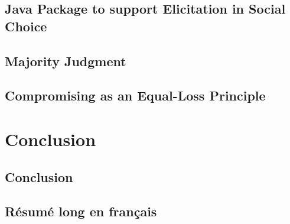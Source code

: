 \documentclass[a4paper, 11pt,oneside]{book}
\begin{document}
	\chapter{Java Package to support Elicitation in Social Choice}
		\label{ch:uml}
		
	\chapter{Majority Judgment}
		\label{ch:MJ}
		

	\chapter{Compromising as an Equal-Loss Principle}
	\label{ch:compromise}
		

\part{Conclusion}
	\chapter{Conclusion}
		\label{ch:conclusion}
		




\backmatter
{}



 

\chapter{Résumé long en français}

\end{document}
